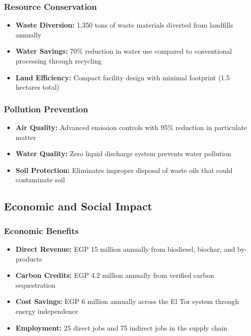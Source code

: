 \subsubsection{Resource Conservation}
\begin{itemize}
    \item \textbf{Waste Diversion:} 1,350 tons of waste materials diverted from landfills annually
    \item \textbf{Water Savings:} 70\% reduction in water use compared to conventional processing through recycling
    \item \textbf{Land Efficiency:} Compact facility design with minimal footprint (1.5 hectares total)
\end{itemize}

\subsubsection{Pollution Prevention}
\begin{itemize}
    \item \textbf{Air Quality:} Advanced emission controls with 95\% reduction in particulate matter
    \item \textbf{Water Quality:} Zero liquid discharge system prevents water pollution
    \item \textbf{Soil Protection:} Eliminates improper disposal of waste oils that could contaminate soil
\end{itemize}

\subsection{Economic and Social Impact}

\subsubsection{Economic Benefits}
\begin{itemize}
    \item \textbf{Direct Revenue:} EGP 15 million annually from biodiesel, biochar, and by-products
    \item \textbf{Carbon Credits:} EGP 4.2 million annually from verified carbon sequestration
    \item \textbf{Cost Savings:} EGP 6 million annually across the El Tor system through energy independence
    \item \textbf{Employment:} 25 direct jobs and 75 indirect jobs in the supply chain
\end{itemize}

